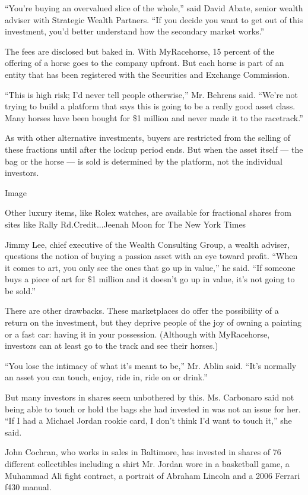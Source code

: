 ``You're buying an overvalued slice of the whole,'' said David Abate,
senior wealth adviser with Strategic Wealth Partners. ``If you decide
you want to get out of this investment, you'd better understand how the
secondary market works.''

The fees are disclosed but baked in. With MyRacehorse, 15 percent of the
offering of a horse goes to the company upfront. But each horse is part
of an entity that has been registered with the Securities and Exchange
Commission.

``This is high risk; I'd never tell people otherwise,'' Mr. Behrens
said. ``We're not trying to build a platform that says this is going to
be a really good asset class. Many horses have been bought for \$1
million and never made it to the racetrack.''

As with other alternative investments, buyers are restricted from the
selling of these fractions until after the lockup period ends. But when
the asset itself --- the bag or the horse --- is sold is determined by
the platform, not the individual investors.

Image

Other luxury items, like Rolex watches, are available for fractional
shares from sites like Rally Rd.Credit...Jeenah Moon for The New York
Times

Jimmy Lee, chief executive of the Wealth Consulting Group, a wealth
adviser, questions the notion of buying a passion asset with an eye
toward profit. ``When it comes to art, you only see the ones that go up
in value,'' he said. ``If someone buys a piece of art for \$1 million
and it doesn't go up in value, it's not going to be sold.''

There are other drawbacks. These marketplaces do offer the possibility
of a return on the investment, but they deprive people of the joy of
owning a painting or a fast car: having it in your possession. (Although
with MyRacehorse, investors can at least go to the track and see their
horses.)

``You lose the intimacy of what it's meant to be,'' Mr. Ablin said.
``It's normally an asset you can touch, enjoy, ride in, ride on or
drink.''

But many investors in shares seem unbothered by this. Ms. Carbonaro said
not being able to touch or hold the bags she had invested in was not an
issue for her. ``If I had a Michael Jordan rookie card, I don't think
I'd want to touch it,'' she said.

John Cochran, who works in sales in Baltimore, has invested in shares of
76 different collectibles including a shirt Mr. Jordan wore in a
basketball game, a Muhammad Ali fight contract, a portrait of Abraham
Lincoln and a 2006 Ferrari f430 manual.

